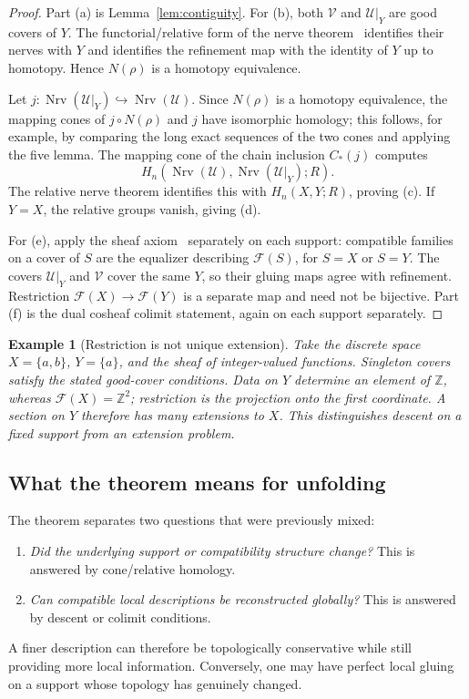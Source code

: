 \documentclass[11pt]{article}
\newtheorem{example}[theorem]{Example}
\newcommand{\Nrv}{\operatorname{Nrv}}
\begin{document}
\begin{proof}
Part (a) is Lemma~\ref{lem:contiguity}.  For (b), both $\mathcal V$ and $\mathcal U|_Y$ are good covers of $Y$.  The functorial/relative form of the nerve theorem~\cite{BauerEtAl2023,Ramras2026} identifies their nerves with $Y$ and identifies the refinement map with the identity of $Y$ up to homotopy.  Hence $N(\rho)$ is a homotopy equivalence.

Let $j:\Nrv(\mathcal U|_Y)\hookrightarrow\Nrv(\mathcal U)$.  Since $N(\rho)$ is a homotopy equivalence, the mapping cones of $j\circ N(\rho)$ and $j$ have isomorphic homology; this follows, for example, by comparing the long exact sequences of the two cones and applying the five lemma.  The mapping cone of the chain inclusion $C_*(j)$ computes
\[
H_n(\Nrv(\mathcal U),\Nrv(\mathcal U|_Y);R).
\]
The relative nerve theorem identifies this with $H_n(X,Y;R)$, proving (c).  If $Y=X$, the relative groups vanish, giving (d).

For (e), apply the sheaf axiom~\cite{Curry2013} separately on each support: compatible
families on a cover of $S$ are the equalizer describing $\mathcal F(S)$,
for $S=X$ or $S=Y$.  The covers $\mathcal U|_Y$ and $\mathcal V$ cover
the same $Y$, so their gluing maps agree with refinement.  Restriction
$\mathcal F(X)\to\mathcal F(Y)$ is a separate map and need not be bijective.
Part (f) is the dual cosheaf colimit statement, again on each support separately.
\end{proof}

\begin{example}[Restriction is not unique extension]
Take the discrete space $X=\{a,b\}$, $Y=\{a\}$, and the sheaf of
integer-valued functions.  Singleton covers satisfy the stated good-cover
conditions.  Data on $Y$ determine an element of $\mathbb Z$, whereas
$\mathcal F(X)=\mathbb Z^2$; restriction is the projection onto the first
coordinate.  A section on $Y$ therefore has many extensions to $X$.
This distinguishes descent on a fixed support from an extension problem.
\end{example}

\subsection{What the theorem means for unfolding}
The theorem separates two questions that were previously mixed:
\begin{enumerate}[label=(\roman*)]
\item \emph{Did the underlying support or compatibility structure change?}  This is answered by cone/relative homology.
\item \emph{Can compatible local descriptions be reconstructed globally?}  This is answered by descent or colimit conditions.
\end{enumerate}
A finer description can therefore be topologically conservative while still providing more local information.  Conversely, one may have perfect local gluing on a support whose topology has genuinely changed.
\end{document}
